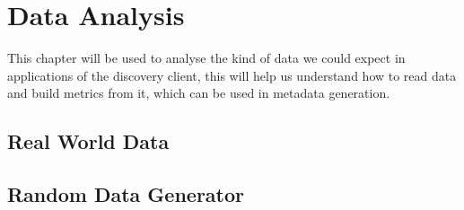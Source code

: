 \chapter{Data Analysis}\label{ch:dataanalysis}
This chapter will be used to analyse the kind of data we could expect in applications of the discovery client,
this will help us understand how to read data and build metrics from it, which can be used in metadata generation.


\section{Real World Data}\label{sec:real-world-data}



\section{Random Data Generator}\label{sec:random-data-generator}
